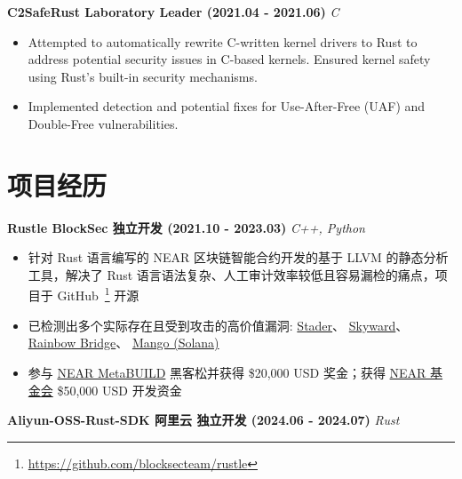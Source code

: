     \ifdefined\qr\else

        \noindent\textbf{C2SafeRust \textbar{} Laboratory \textbar{} Leader (2021.04 - 2021.06)} \hfill \textsl{C}

        \begin{itemize}
            \item Attempted to automatically rewrite C-written kernel drivers to Rust to address potential security issues in C-based kernels. Ensured kernel safety using Rust's built-in security mechanisms.
            \item Implemented detection and potential fixes for Use-After-Free (UAF) and Double-Free vulnerabilities.
        \end{itemize}

    \fi

\else

    \section*{项目经历}

    \noindent\textbf{Rustle \textbar{} BlockSec \textbar{} 独立开发 (2021.10 - 2023.03)} \hfill \textsl{C++, Python}

    \begin{itemize}
        \item 针对 Rust 语言编写的 NEAR 区块链智能合约开发的基于 LLVM 的静态分析工具，解决了 Rust 语言语法复杂、人工审计效率较低且容易漏检的痛点，项目于 GitHub~\footnote{\url{https://github.com/blocksecteam/rustle}} 开源
        \item 已检测出多个实际存在且受到攻击的高价值漏洞:
              \href{https://blog.staderlabs.com/stader-near-incident-report-08-16-2022-afe077ffd549}{Stader}、
              \href{https://coinculture.com/au/business/skyward-finance-reportedly-suffers-3m-exploit-on-near-protocol/}{Skyward}、
              \href{https://cryptopotato.com/defi-crisis-averted-near-protocols-rainbow-bridge-attacker-loses-2-5-eth/}{Rainbow Bridge}、
              \href{https://blog.perp.fi/dissecting-the-mango-exploit-how-risk-is-mitigated-on-perp-v2-eccc91987c91}{Mango (Solana)}
        \item 参与 \href{https://devpost.com/software/rustle}{NEAR MetaBUILD} 黑客松并获得 \$20,000 USD 奖金；获得 \href{https://near.foundation}{NEAR 基金会} \$50,000 USD 开发资金
    \end{itemize}

    \noindent\textbf{Aliyun-OSS-Rust-SDK \textbar{} 阿里云 \textbar{} 独立开发 (2024.06 - 2024.07)} \hfill \textsl{Rust}

